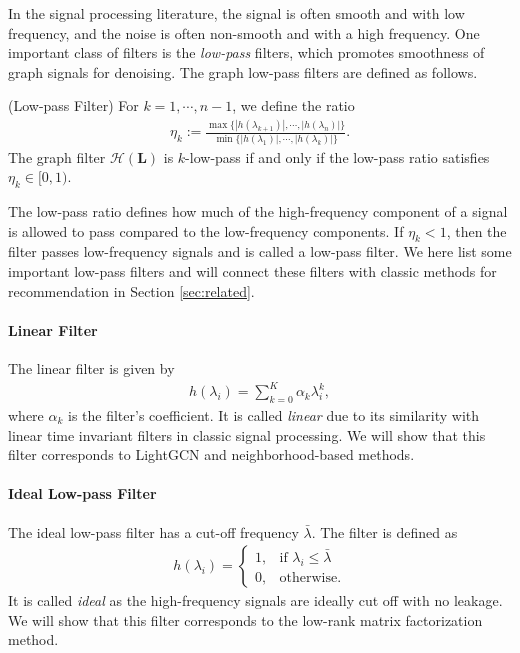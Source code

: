 \documentclass[sigconf]{acmart}
\begin{document}
In the signal processing literature, the signal is often smooth and with low frequency, and the noise is often non-smooth and with a high frequency. One important class of filters is the \emph{low-pass} filters, which promotes smoothness of graph signals for denoising. The graph low-pass filters are defined as follows. 
\begin{definition} (Low-pass Filter) \label{def:lpf}
    For $k = 1, \cdots, n-1$, we define the ratio
    \begin{align} \label{eq:low-pass}
        \eta_k := \frac{\max\{|h(\lambda_{k+1})|, \cdots, |h(\lambda_{n})| \} }{\min\{ |h(\lambda_{1})|, \cdots, |h(\lambda_{k})| \} }.
    \end{align}
    The graph filter $\mathcal{H}(\bm{L})$ is $k$-low-pass if and only if the low-pass ratio satisfies $\eta_k \in [0,1)$.
\end{definition}
The low-pass ratio defines how much of the high-frequency component of a signal is allowed to pass compared to the low-frequency components. If $\eta_k < 1$, then the filter passes low-frequency signals and is  called a low-pass filter. We here list some important low-pass filters and will connect these filters with classic methods for recommendation in Section \ref{sec:related}.
\paragraph{Linear Filter} The linear filter is given by 
\begin{align} \label{fil:linear}
    h(\lambda_i) = \sum_{k=0}^{K} \alpha_k \lambda_i^k,
\end{align}
where $\alpha_k$ is the filter's coefficient. It is called \emph{linear} due to its similarity with linear time invariant filters in classic signal processing. We will show that this filter corresponds to LightGCN and neighborhood-based methods.

\paragraph{Ideal Low-pass Filter} 
The ideal low-pass filter has a cut-off frequency $\bar{\lambda}$. The filter is defined as 
\begin{align} \label{fil:low}
    h(\lambda_i) = \left\{
             \begin{array}{lr}
             1, & \text{if } \lambda_i \leq \bar{\lambda}  \\
             0, & \text{otherwise}.
             \end{array}
\right.
\end{align}
It is called \emph{ideal} as the high-frequency signals are ideally cut off with no leakage. We will show that this filter corresponds to the low-rank matrix factorization method. 
\end{document}
